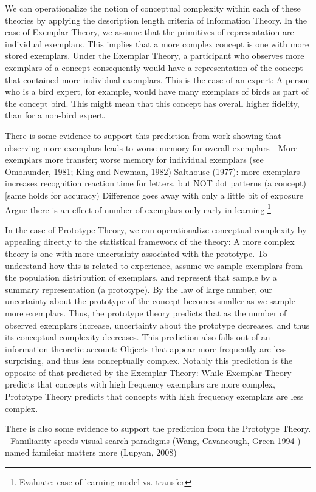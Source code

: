 We can operationalize the notion of conceptual complexity within each of these theories by applying the description length criteria of Information Theory. In the case of Exemplar Theory, we  assume that the primitives of representation are individual exemplars. This implies that a more complex concept is one with more stored exemplars. Under the Exemplar Theory, a participant who observes more exemplars of a concept consequently would have a representation of the concept that contained more individual exemplars. This is the case of an expert: A person who is a bird expert, for example, would have many exemplars of birds as part of the concept bird. This might mean that this concept has overall higher fidelity, than for a non-bird expert. 

There is some evidence to support this prediction from work showing that observing more exemplars leads to worse memory for overall exemplars
- More exemplars more transfer; worse memory for individual exemplars (see Omohunder, 1981; King and Newman, 1982)
Salthouse (1977): more exemplars increases recognition reaction time for letters, but NOT dot patterns (a concept) [same holds for accuracy)
Difference goes away with only a little bit of exposure
Argue there is an effect of number of exemplars only early in learning
\footnote{Evaluate: ease of learning model vs. transfer}
 
In the case of Prototype Theory, we can operationalize conceptual complexity by appealing  directly to the statistical framework of the theory: A more complex theory is one with more uncertainty associated with the prototype. To understand how this is related to experience, assume we sample exemplars from the population distribution of exemplars, and represent that sample by a summary representation (a prototype). By the law of large number, our uncertainty about the prototype of the concept becomes smaller as we sample more exemplars. Thus, the prototype theory predicts that as the number of observed exemplars increase, uncertainty about the prototype decreases, and thus its conceptual complexity decreases.  This prediction also falls out of an information theoretic account: Objects that appear more frequently are less surprising, and thus less conceptually complex. Notably this prediction is the opposite of that predicted by the Exemplar Theory: While Exemplar Theory predicts that concepts with high frequency exemplars are more complex, Prototype Theory predicts that concepts with high frequency exemplars are less complex. 

There is also some evidence to support the prediction from the Prototype Theory.
- Familiarity speeds visual search paradigms (Wang, Cavaneough, Green 1994 ) 
- named famileiar matters more (Lupyan, 2008)

